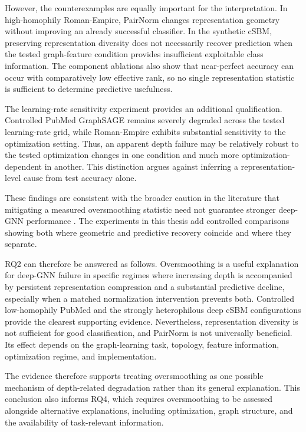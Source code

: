 \documentclass[english]{lni}
\begin{document}
However, the counterexamples are equally important for the interpretation. In high-homophily Roman-Empire, PairNorm changes representation geometry without improving an already successful classifier. In the synthetic cSBM, preserving representation diversity does not necessarily recover prediction when the tested graph-feature condition provides insufficient exploitable class information. The component ablations also show that near-perfect accuracy can occur with comparatively low effective rank, so no single representation statistic is sufficient to determine predictive usefulness.

The learning-rate sensitivity experiment provides an additional qualification. Controlled PubMed GraphSAGE remains severely degraded across the tested learning-rate grid, while Roman-Empire exhibits substantial sensitivity to the optimization setting. Thus, an apparent depth failure may be relatively robust to the tested optimization changes in one condition and much more optimization-dependent in another. This distinction argues against inferring a representation-level cause from test accuracy alone.

These findings are consistent with the broader caution in the literature that mitigating a measured oversmoothing statistic need not guarantee stronger deep-GNN performance \cite{rusch2023oversmoothing,kormann2026position,arnaiz2026demystifying}. The experiments in this thesis add controlled comparisons showing both where geometric and predictive recovery coincide and where they separate.

RQ2 can therefore be answered as follows. Oversmoothing is a useful explanation for deep-GNN failure in specific regimes where increasing depth is accompanied by persistent representation compression and a substantial predictive decline, especially when a matched normalization intervention prevents both. Controlled low-homophily PubMed and the strongly heterophilous deep cSBM configurations provide the clearest supporting evidence. Nevertheless, representation diversity is not sufficient for good classification, and PairNorm is not universally beneficial. Its effect depends on the graph-learning task, topology, feature information, optimization regime, and implementation.

The evidence therefore supports treating oversmoothing as one possible mechanism of depth-related degradation rather than its general explanation. This conclusion also informs RQ4, which requires oversmoothing to be assessed alongside alternative explanations, including optimization, graph structure, and the availability of task-relevant information.
\end{document}
